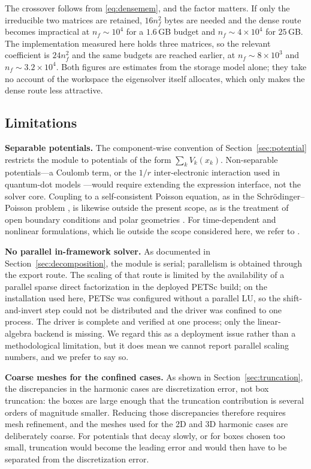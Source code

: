 \documentclass[pdflatex,sn-mathphys-num]{sn-jnl}
\theoremstyle{thmstyleone}%
\theoremstyle{thmstyletwo}%
\theoremstyle{thmstylethree}%
\begin{document}
The crossover follows from \eqref{eq:densemem}, and the factor matters. If only
the irreducible two matrices are retained, $16n_f^2$ bytes are needed and the
dense route becomes impractical at $n_f \sim 10^4$ for a $1.6$\,GB budget and
$n_f \sim 4\times10^4$ for $25$\,GB. The implementation measured here holds
three matrices, so the relevant coefficient is $24n_f^2$ and the same budgets
are reached earlier, at $n_f \sim 8\times10^3$ and $n_f \sim 3.2\times10^4$.
Both figures are estimates from the storage model alone; they take no account of
the workspace the eigensolver itself allocates, which only makes the dense route
less attractive.

\subsection{Limitations}\label{sec:limitations}

\textbf{Separable potentials.} The component-wise convention of
Section~\ref{sec:potential} restricts the module to potentials of the form
$\sum_k V_k(x_k)$. Non-separable potentials---a Coulomb term, or the $1/r$
inter-electronic interaction used in quantum-dot models \cite{caruso2019}---would
require extending the expression interface, not the solver core. Coupling to a
self-consistent Poisson equation, as in the Schr\"odinger--Poisson problem
\cite{wang2009,coos2014}, is likewise outside the present scope, as is the
treatment of open boundary conditions and polar geometries \cite{polar2020}.
For time-dependent and nonlinear formulations, which lie outside the scope
considered here, we refer to \cite{sav2023,liu2020}.

\textbf{No parallel in-framework solver.} As documented in
Section~\ref{sec:decomposition}, the module is serial; parallelism is obtained
through the export route. The scaling of that route is limited by the
availability of a parallel sparse direct factorization in the deployed PETSc
build; on the installation used here, PETSc was configured without a parallel
LU, so the shift-and-invert step could not be distributed and the driver was
confined to one process. The driver is complete and verified at one process;
only the linear-algebra backend is missing. We regard this as a deployment issue
rather than a methodological limitation, but it does mean we cannot report
parallel scaling numbers, and we prefer to say so.

\textbf{Coarse meshes for the confined cases.} As shown in
Section~\ref{sec:truncation}, the discrepancies in the harmonic cases are
discretization error, not box truncation: the boxes are large enough that the
truncation contribution is several orders of magnitude smaller. Reducing those
discrepancies therefore requires mesh refinement, and the meshes used for the 2D
and 3D harmonic cases are deliberately coarse. For potentials that decay slowly,
or for boxes chosen too small, truncation would become the leading error and
would then have to be separated from the discretization error.
\end{document}
